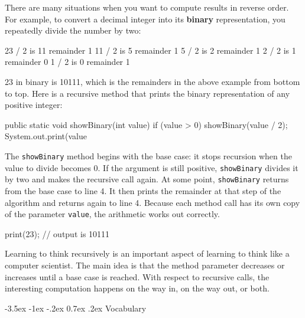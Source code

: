 \documentclass[12pt]{book}
\makeatletter
\renewcommand{\section}{\@startsection {section}{1}{\z@}%
    {-3.5ex \@plus -1ex \@minus -.2ex}%
    {0.7ex \@plus.2ex}%
    {\normalfont\Large\bfseries}}
\theoremstyle{exercise}
\newcommand{\java}[1]{\lstinline{#1}} %
\makeatother
\begin{document}
There are many situations when you want to compute results in reverse order.
For example, to convert a decimal integer into its {\bf binary} representation, you repeatedly divide the number by two:

\begin{stdout}
23 / 2 is 11 remainder 1
11 / 2 is  5 remainder 1
 5 / 2 is  2 remainder 1
 2 / 2 is  1 remainder 0
 1 / 2 is  0 remainder 1
\end{stdout}

23 in binary is 10111, which is the remainders in the above example from bottom to top.
Here is a recursive method that prints the binary representation of any positive integer:

\begin{code}
    public static void showBinary(int value) {
        if (value > 0) {
            showBinary(value / 2);
            System.out.print(value %
        }
    }
\end{code}

The \java{showBinary} method begins with the base case: it stops recursion when the value to divide becomes 0.
If the argument is still positive, \java{showBinary} divides it by two and makes the recursive call again.
At some point, \java{showBinary} returns from the base case to line 4.
It then prints the remainder at that step of the algorithm and returns again to line 4.
Because each method call has its own copy of the parameter \java{value}, the arithmetic works out correctly.

\begin{code}
    print(23);    
    // output is 10111
\end{code}

Learning to think recursively is an important aspect of learning to think like a computer scientist.
The main idea is that the method parameter decreases or increases until a base case is reached.
With respect to recursive calls, the interesting computation happens on the way in, on the way out, or both.


\section{Vocabulary}
\end{document}
